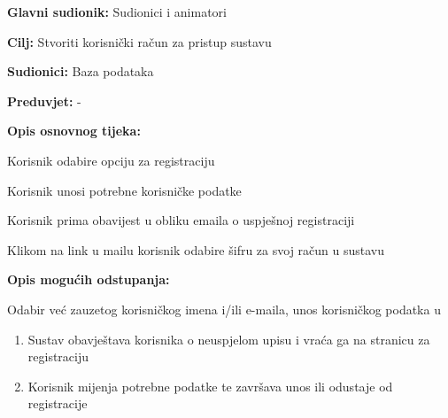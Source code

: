 \noindent {}
\begin{packed_item}

	\item \textbf{Glavni sudionik: }Sudionici i animatori
	\item  \textbf{Cilj:} Stvoriti korisnički račun za pristup sustavu
	\item  \textbf{Sudionici:} Baza podataka
	\item  \textbf{Preduvjet:} -
	\item  \textbf{Opis osnovnog tijeka:}

	\item[] \begin{packed_enum}

				\item Korisnik odabire opciju za registraciju
				\item Korisnik unosi potrebne korisničke podatke
				\item Korisnik prima obavijest u obliku emaila o uspješnoj registraciji
				\item Klikom na link u mailu korisnik odabire šifru za svoj račun u sustavu
	\end{packed_enum}

	\item  \textbf{Opis mogućih odstupanja:}

	\begin{packed_item}


		\item[2.a] Odabir već zauzetog korisničkog imena i/ili e-maila, unos korisničkog podatka u
		\begin{enumerate}
			\item Sustav obavještava korisnika o neuspjelom upisu i vraća ga na stranicu za registraciju
			\item Korisnik mijenja potrebne podatke te završava unos ili odustaje od registracije


		\end{enumerate}
	\end{packed_item}
\end{packed_item}
\pagebreak
\noindent {}
